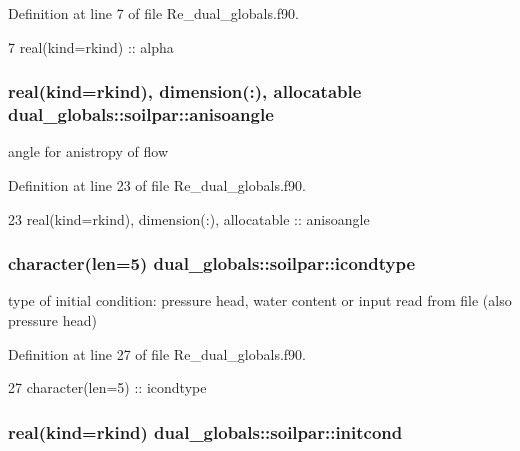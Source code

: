 Definition at line 7 of file Re\+\_\+dual\+\_\+globals.\+f90.


\begin{DoxyCode}
7     \textcolor{keywordtype}{real(kind=rkind)} :: alpha
\end{DoxyCode}
\subsubsection[{anisoangle}]{\setlength{\rightskip}{0pt plus 5cm}real(kind=rkind), dimension(\+:), allocatable dual\+\_\+globals\+::soilpar\+::anisoangle}\label{structdual__globals_1_1soilpar_a13e82c05eedeb29d851a09b0d663ff80}


angle for anistropy of flow 



Definition at line 23 of file Re\+\_\+dual\+\_\+globals.\+f90.


\begin{DoxyCode}
23     \textcolor{keywordtype}{real(kind=rkind)}, \textcolor{keywordtype}{dimension(:)}, \textcolor{keywordtype}{allocatable}   :: anisoangle
\end{DoxyCode}
\subsubsection[{icondtype}]{\setlength{\rightskip}{0pt plus 5cm}character(len=5) dual\+\_\+globals\+::soilpar\+::icondtype}\label{structdual__globals_1_1soilpar_a9a9a169e1ddd733114f4a370658b0ce2}


type of initial condition\+: pressure head, water content or input read from file (also pressure head) 



Definition at line 27 of file Re\+\_\+dual\+\_\+globals.\+f90.


\begin{DoxyCode}
27     \textcolor{keywordtype}{character(len=5)} :: icondtype
\end{DoxyCode}
\subsubsection[{initcond}]{\setlength{\rightskip}{0pt plus 5cm}real(kind=rkind) dual\+\_\+globals\+::soilpar\+::initcond}\label{structdual__globals_1_1soilpar_a3bfca09ee48af7e66657ebf8a9725c91}


